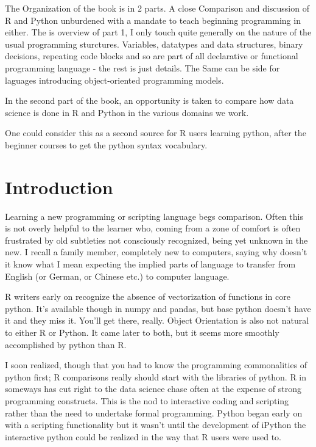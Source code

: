 \documentclass[]{book}
\theoremstyle{definition}
\theoremstyle{definition}
\theoremstyle{definition}
\theoremstyle{remark}
\begin{document}
The Organization of the book is in 2 parts. A close Comparison and
discussion of R and Python unburdened with a mandate to teach beginning
programming in either. The is overview of part 1, I only touch quite
generally on the nature of the usual programming sturctures. Variables,
datatypes and data structures, binary decisions, repeating code blocks
and so are part of all declarative or functional programming language -
the rest is just details. The Same can be side for laguages introducing
object-oriented programming models.

In the second part of the book, an opportunity is taken to compare how
data science is done in R and Python in the various domains we work.

One could consider this as a second source for R users learning python,
after the beginner courses to get the python syntax vocabulary.

\chapter{Introduction}\label{introduction}

Learning a new programming or scripting language begs comparison. Often
this is not overly helpful to the learner who, coming from a zone of
comfort is often frustrated by old subtleties not consciously
recognized, being yet unknown in the new. I recall a family member,
completely new to computers, saying why doesn't it know what I mean
expecting the implied parts of language to transfer from English (or
German, or Chinese etc.) to computer language.

R writers early on recognize the absence of vectorization of functions
in core python. It's available though in numpy and pandas, but base
python doesn't have it and they miss it. You'll get there, really.
Object Orientation is also not natural to either R or Python. It came
later to both, but it seems more smoothly accomplished by python than R.

I soon realized, though that you had to know the programming
commonalities of python first; R comparisons really should start with
the libraries of python. R in someways has cut right to the data science
chase often at the expense of strong programming constructs. This is the
nod to interactive coding and scripting rather than the need to
undertake formal programming. Python began early on with a scripting
functionality but it wasn't until the development of iPython the
interactive python could be realized in the way that R users were used
to.
\end{document}

